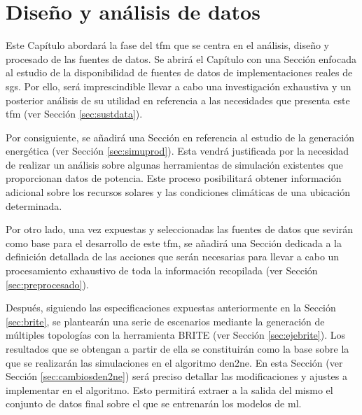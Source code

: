 \chapter{Diseño y análisis de datos}
\label{ch:analisis}

Este Capítulo abordará la fase del \gls{tfm} que se centra en el análisis, diseño y procesado de las fuentes de datos. Se abrirá el Capítulo con una Sección enfocada al estudio de la disponibilidad de fuentes de datos de implementaciones reales de \gls{sg}s. Por ello, será imprescindible llevar a cabo una investigación exhaustiva y un posterior análisis de su utilidad en referencia a las necesidades que presenta este \gls{tfm} (ver Sección \ref{sec:sustdata}).

\vspace{3mm}

Por consiguiente, se añadirá una Sección en referencia al estudio de la generación energética (ver Sección \ref{sec:simuprod}). Esta vendrá justificada por la necesidad de realizar un análisis sobre algunas herramientas de simulación existentes que proporcionan datos de potencia. Este proceso posibilitará obtener información adicional sobre los recursos solares y las condiciones climáticas de una ubicación determinada.

\vspace{3mm}

Por otro lado, una vez expuestas y seleccionadas las fuentes de datos que sevirán como base para el desarrollo de este \gls{tfm}, se añadirá una Sección dedicada a la definición detallada de las acciones que serán necesarias para llevar a cabo un procesamiento exhaustivo de toda la información recopilada (ver Sección \ref{sec:preprocesado}). 

\vspace{3mm}

Después, siguiendo las especificaciones expuestas anteriormente en la Sección \ref{sec:brite}, se plantearán una serie de escenarios mediante la generación de múltiples topologías con la herramienta BRITE (ver Sección \ref{sec:ejebrite}). Los resultados que se obtengan a partir de ella se constituirán como la base sobre la que se realizarán las simulaciones en el algoritmo \gls{den2ne}. En esta Sección (ver Sección \ref{sec:cambiosden2ne}) será preciso detallar las modificaciones y ajustes a implementar en el algoritmo. Esto permitirá extraer a la salida del mismo el conjunto de datos final sobre el que se entrenarán los modelos de \gls{ml}.

\vspace{3mm}

